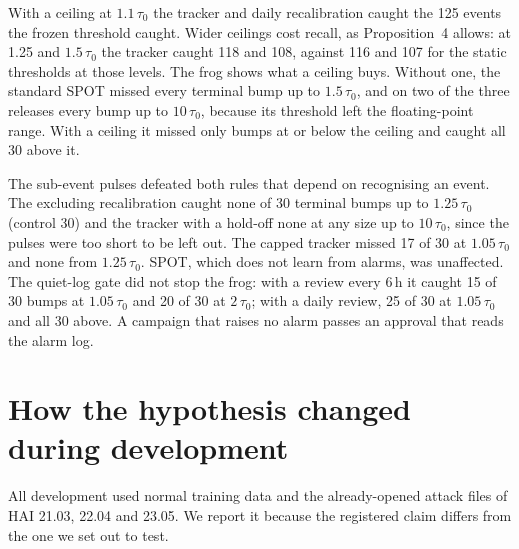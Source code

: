 \documentclass[sigconf,review,anonymous]{acmart}
\begin{document}
With a ceiling at $1.1\,\tau_0$ the tracker and daily recalibration caught the 125 events the frozen
threshold caught. Wider ceilings cost recall, as Proposition~4 allows: at 1.25 and $1.5\,\tau_0$ the
tracker caught 118 and 108, against 116 and 107 for the static thresholds at those levels. The frog
shows what a ceiling buys. Without one, the standard SPOT missed every terminal bump up to
$1.5\,\tau_0$, and on two of the three releases every bump up to $10\,\tau_0$, because its threshold
left the floating-point range. With a ceiling it missed only bumps at or below the ceiling and caught
all 30 above it.

The sub-event pulses defeated both rules that depend on recognising an event. The excluding
recalibration caught none of 30 terminal bumps up to $1.25\,\tau_0$ (control 30) and the tracker with
a hold-off none at any size up to $10\,\tau_0$, since the pulses were too short to be left out. The capped
tracker missed 17 of 30 at $1.05\,\tau_0$ and none from $1.25\,\tau_0$. SPOT, which does not learn
from alarms, was unaffected. The quiet-log gate did not stop the frog: with a review every 6\,h it
caught 15 of 30 bumps at $1.05\,\tau_0$ and 20 of 30 at $2\,\tau_0$; with a daily review, 25 of 30
at $1.05\,\tau_0$ and all 30 above. A campaign that raises no alarm passes an approval that reads
the alarm log.

\FloatBarrier
\section{How the hypothesis changed during development}
\label{sec:development}

All development used normal training data and the already-opened attack files of HAI 21.03, 22.04
and 23.05. We report it because the registered claim differs from the one we set out to test.
\end{document}
